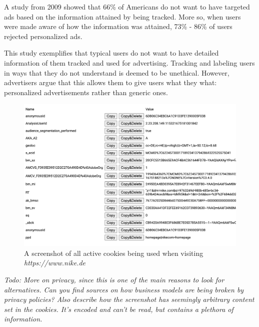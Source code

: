 A study from 2009 showed that 66\% of Americans do not want to have targeted ads based on the information attained by being tracked. More so, when users were made aware of how the information was attained, 73\% - 86\% of users rejected personalized ads. \cite{americansRejectAds}

This study exemplifies that typical users do not want to have detailed information of them tracked and used for advertising. Tracking and labeling users in ways that they do not understand is deemed to be unethical. However, advertisers argue that this allows them to give users what they what: personalized advertisements rather than generic ones. \cite{americansRejectAds}

\begin{figure}[t]
\includegraphics[width=\textwidth]{./gfx/cookiesScreenshot.png}
\centering
\caption{A screenshot of all active cookies being used when visiting \textit{https://www.nike.de}}
\label{fig:nikeCookies}
\end{figure}

\textit{\color{red}Todo: More on privacy, since this is one of the main reasons to look for alternatives. Can you find sources on how business models are being broken by privacy policies? Also describe how the screenshot has seemingly arbitrary content set in the cookies. It's encoded and can't be read, but contains a plethora of information.}
